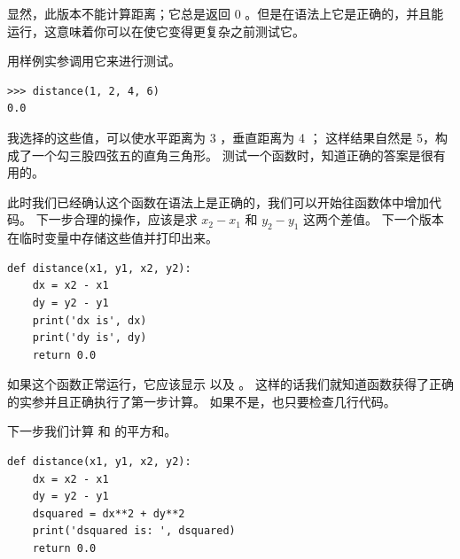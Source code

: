 显然，此版本不能计算距离；它总是返回 0 。但是在语法上它是正确的，并且能运行，这意味着你可以在使它变得更复杂之前测试它。


用样例实参调用它来进行测试。

\begin{lstlisting}
>>> distance(1, 2, 4, 6)
0.0
\end{lstlisting}

%

我选择的这些值，可以使水平距离为 3 ，垂直距离为 4 ；
这样结果自然是 5，构成了一个勾三股四弦五的直角三角形。
测试一个函数时，知道正确的答案是很有用的。


此时我们已经确认这个函数在语法上是正确的，我们可以开始往函数体中增加代码。
下一步合理的操作，应该是求 $x_2 - x_1$ 和 $y_2 - y_1$ 这两个差值。
下一个版本在临时变量中存储这些值并打印出来。

\begin{lstlisting}
def distance(x1, y1, x2, y2):
    dx = x2 - x1
    dy = y2 - y1
    print('dx is', dx)
    print('dy is', dy)
    return 0.0
\end{lstlisting}

%

如果这个函数正常运行，它应该显示   以及  。
这样的话我们就知道函数获得了正确的实参并且正确执行了第一步计算。
如果不是，也只要检查几行代码。


下一步我们计算  和  的平方和。

\begin{lstlisting}
def distance(x1, y1, x2, y2):
    dx = x2 - x1
    dy = y2 - y1
    dsquared = dx**2 + dy**2
    print('dsquared is: ', dsquared)
    return 0.0
\end{lstlisting}

